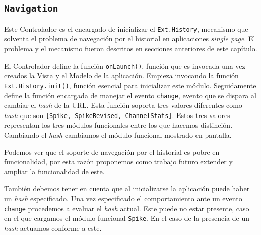 	\subsection{\texttt{Navigation}}
		Este Controlador es el encargado de inicializar el \texttt{Ext.History}, mecanismo que solventa el problema de navegación por el
		historial en aplicaciones \emph{single page}. El problema y el mecanismo fueron descritos en secciones anteriores de este capítulo.
		\par
		El Controlador define la función \texttt{onLaunch()}, función que es invocada una vez creados la Vista y el Modelo de la aplicación.
		Empieza invocando la función \texttt{Ext.History.init()}, función esencial para inicializar este módulo. Seguidamente define la
		función encargada de manejar el evento \texttt{change}, evento que se dispara al cambiar el \emph{hash} de la URL. Esta función
		soporta tres valores diferentes como \emph{hash} que son \texttt{[Spike, SpikeRevised, ChannelStats]}. Estos tres valores representan
		los tres módulos funcionales entre los que hacemos distinción. Cambiando el \emph{hash} cambiamos el módulo funcional mostrado en
		pantalla.
		\par
		Podemos ver que el soporte de navegación por el historial es pobre en funcionalidad, por esta razón proponemos como trabajo futuro
		extender y ampliar la funcionalidad de este.
		\par
		También debemos tener en cuenta que al inicializarse la aplicación puede haber un \emph{hash} especificado. Una vez especificado el
		comportamiento ante un evento \texttt{change} procedemos a evaluar el \emph{hash} actual. Este puede no estar presente, caso en el que
		cargamos el módulo funcional \texttt{Spike}. En el caso de la presencia de un \emph{hash} actuamos conforme a este.
